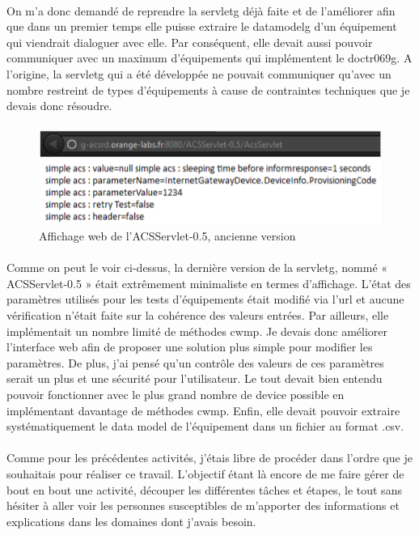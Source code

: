 \documentclass[12pt,a4paper]{report}
\begin{document}
\paragraph*{}On m’a donc demandé de reprendre la \gls{servletg} déjà faite et de l’améliorer afin que dans un premier temps elle puisse extraire le \gls{datamodelg} d’un équipement qui viendrait dialoguer avec elle. Par conséquent, elle devait aussi pouvoir communiquer avec un maximum d'équipements qui implémentent le \gls{doctr069g}. A l’origine, la \gls{servletg} qui a été développée ne pouvait communiquer qu’avec un nombre restreint de types d'équipements à cause de contraintes techniques que je devais donc résoudre.
\paragraph*{}
\begin{figure}[!ht]
    \center
    \includegraphics[scale=0.9]{./img/acs_servlet_05.png}
    \caption{Affichage web de l’ACSServlet-0.5, ancienne version}
\end{figure}
\paragraph*{}Comme on peut le voir ci-dessus, la dernière version de la \gls{servletg}, nommé « ACSServlet-0.5 » était extrêmement minimaliste en termes d'affichage. L'état des paramètres utilisés pour les tests d'équipements était modifié via l’url et aucune vérification n’était faite sur la cohérence des valeurs entrées. Par ailleurs, elle implémentait un nombre limité de méthodes \gls{cwmp}. Je devais donc améliorer l’interface web afin de proposer une solution plus simple pour modifier les paramètres. De plus, j’ai pensé qu’un contrôle des valeurs de ces paramètres serait un plus et une sécurité pour l’utilisateur. Le tout devait bien entendu pouvoir fonctionner avec le plus grand nombre de device possible en implémentant davantage de méthodes \gls{cwmp}. Enfin, elle devait pouvoir extraire systématiquement le data model de l’équipement dans un fichier au format .csv.
\paragraph*{}Comme pour les précédentes activités, j’étais libre de procéder dans l’ordre que je souhaitais pour réaliser ce travail. L’objectif étant là encore de me faire gérer de bout en bout une activité, découper les différentes tâches et étapes, le tout sans hésiter à aller voir les personnes susceptibles de m’apporter des informations et explications dans les domaines dont j’avais besoin.
\end{document}
